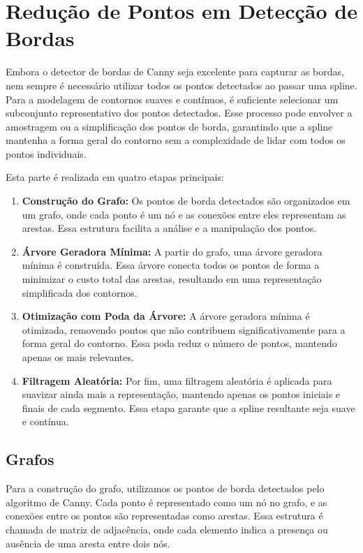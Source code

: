\newpage

\section{Redução de Pontos em Detecção de Bordas}
\label{sec:reduzindo-pontos-deteccao-bordas}


Embora o detector de bordas de Canny seja excelente para capturar as bordas, nem sempre é necessário utilizar todos os pontos detectados ao passar uma spline. Para a modelagem de contornos suaves e contínuos, é suficiente selecionar um subconjunto representativo dos pontos detectados. Esse processo pode envolver a amostragem ou a simplificação dos pontos de borda, garantindo que a spline mantenha a forma geral do contorno sem a complexidade de lidar com todos os pontos individuais.

Esta parte é realizada em quatro etapas principais:
\begin{enumerate}
    \item \textbf{Construção do Grafo:} Os pontos de borda detectados são organizados em um grafo, onde cada ponto é um nó e as conexões entre eles representam as arestas. Essa estrutura facilita a análise e a manipulação dos pontos.
    \item \textbf{Árvore Geradora Mínima:} A partir do grafo, uma árvore geradora mínima é construída. Essa árvore conecta todos os pontos de forma a minimizar o custo total das arestas, resultando em uma representação simplificada dos contornos.
    \item \textbf{Otimização com Poda da Árvore:} A árvore geradora mínima é otimizada, removendo pontos que não contribuem significativamente para a forma geral do contorno. Essa poda reduz o número de pontos, mantendo apenas os mais relevantes.
    \item \textbf{Filtragem Aleatória:} Por fim, uma filtragem aleatória é aplicada para suavizar ainda mais a representação, mantendo apenas os pontos iniciais e finais de cada segmento. Essa etapa garante que a spline resultante seja suave e contínua.
\end{enumerate}

\subsection{Grafos}

Para a construção do grafo, utilizamos os pontos de borda detectados pelo algoritmo de Canny. Cada ponto é representado como um nó no grafo, e as conexões entre os pontos são representadas como arestas. Essa estrutura é chamada de matriz de adjacência, onde cada elemento indica a presença ou ausência de uma aresta entre dois nós.

